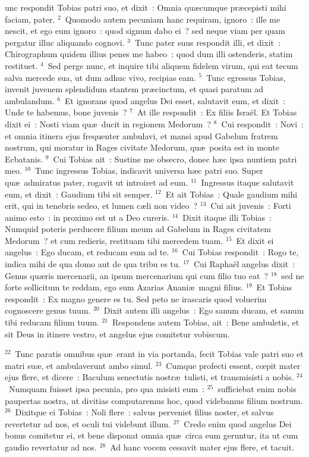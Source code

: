 \bchapter
{}unc respondit Tobias patri suo, et dixit~: Omnia qu\ae cumque pr\ae cepisti mihi faciam, pater.
${}^{2}$~Quomodo autem pecuniam hanc requiram, ignoro~: ille me nescit, et ego eum ignoro~: quod signum dabo ei~? sed neque viam per quam pergatur illuc aliquando cognovi.
${}^{3}$~Tunc pater suus respondit illi, et dixit~: Chirographum quidem illius penes me habeo~: quod dum illi ostenderis, statim restituet.
${}^{4}$~Sed perge nunc, et inquire tibi aliquem fidelem virum, qui eat tecum salva mercede sua, ut dum adhuc vivo, recipias eam.
${}^{5}$~Tunc egressus Tobias, invenit juvenem splendidum stantem pr\ae cinctum, et quasi paratum ad ambulandum.
${}^{6}$~Et ignorans quod angelus Dei esset, salutavit eum, et dixit~: Unde te habemus, bone juvenis~?
${}^{7}$~At ille respondit~: Ex filiis Isra\"el. Et Tobias dixit ei~: Nosti viam qu\ae\ ducit in regionem Medorum~?
${}^{8}$~Cui respondit~: Novi~: et omnia itinera ejus frequenter ambulavi, et mansi apud Gabelum fratrem nostrum, qui moratur in Rages civitate Medorum, qu\ae\ posita est in monte Ecbatanis.
${}^{9}$~Cui Tobias ait~: Sustine me obsecro, donec h\ae c ipsa nuntiem patri meo.
${}^{10}$~Tunc ingressus Tobias, indicavit universa h\ae c patri suo. Super qu\ae\ admiratus pater, rogavit ut introiret ad eum.
${}^{11}$~Ingressus itaque salutavit eum, et dixit~: Gaudium tibi sit semper.
${}^{12}$~Et ait Tobias~: Quale gaudium mihi erit, qui in tenebris sedeo, et lumen c\ae li non video~?
${}^{13}$~Cui ait juvenis~: Forti animo esto~: in proximo est ut a Deo cureris.
${}^{14}$~Dixit itaque illi Tobias~: Numquid poteris perducere filium meum ad Gabelum in Rages civitatem Medorum~? et cum redieris, restituam tibi mercedem tuam.
${}^{15}$~Et dixit ei angelus~: Ego ducam, et reducam eum ad te.
${}^{16}$~Cui Tobias respondit~: Rogo te, indica mihi de qua domo aut de qua tribu es tu.
${}^{17}$~Cui Rapha\"el angelus dixit~: Genus qu\ae ris mercenarii, an ipsum mercenarium qui cum filio tuo eat~?
${}^{18}$~sed ne forte sollicitum te reddam, ego sum Azarias Anani\ae\ magni filius.
${}^{19}$~Et Tobias respondit~: Ex magno genere es tu. Sed peto ne irascaris quod voluerim cognoscere genus tuum.
${}^{20}$~Dixit autem illi angelus~: Ego sanum ducam, et sanum tibi reducam filium tuum.
${}^{21}$~Respondens autem Tobias, ait~: Bene ambuletis, et sit Deus in itinere vestro, et angelus ejus comitetur vobiscum.


${}^{22}$~Tunc paratis omnibus qu\ae\ erant in via portanda, fecit Tobias vale patri suo et matri su\ae , et ambulaverunt ambo simul.
${}^{23}$~Cumque profecti essent, cœpit mater ejus flere, et dicere~: Baculum senectutis nostr\ae\ tulisti, et transmisisti a nobis.
${}^{24}$~Numquam fuisset ipsa pecunia, pro qua misisti eum~:
${}^{25}$~sufficiebat enim nobis paupertas nostra, ut divitias computaremus hoc, quod videbamus filium nostrum.
${}^{26}$~Dixitque ei Tobias~: Noli flere~: salvus perveniet filius noster, et salvus revertetur ad nos, et oculi tui videbunt illum.
${}^{27}$~Credo enim quod angelus Dei bonus comitetur ei, et bene disponat omnia qu\ae\ circa eum geruntur, ita ut cum gaudio revertatur ad nos.
${}^{28}$~Ad hanc vocem cessavit mater ejus flere, et tacuit.

